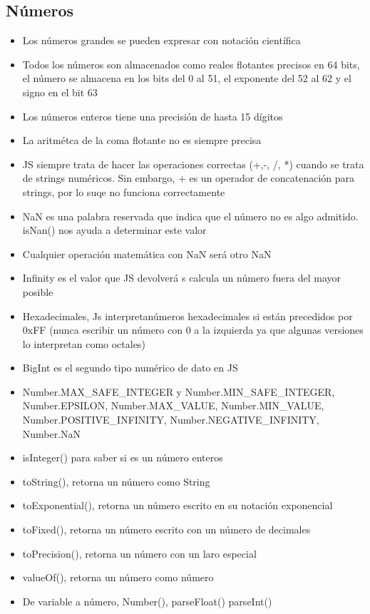 \documentclass{article}
\begin{document}
 \subsection{Números}
 \begin{itemize}
   \item Los números grandes se pueden expresar con notación científica
   \item Todos los números son almacenados como reales flotantes precisos en 64 bits, el número se almacena en los bits del 0 al 51, el exponente del 52 al 62 y el signo en el bit 63
   \item Los números enteros tiene una precisión de hasta 15 dígitos
   \item La aritmétca de la coma flotante no es siempre precisa
   \item JS siempre trata de hacer las operaciones correctas (+,-, /, *) cuando se trata de strings numéricos. Sin embargo, + es un operador de concatenación para strings, por lo suqe no funciona correctamente
   \item NaN es una palabra reservada que indica que el número no es algo admitido. isNan() nos ayuda a determinar este valor
   \item Cualquier operación matemática con NaN será otro NaN
   \item Infinity es el valor que JS devolverá s calcula un número fuera del mayor posible
   \item Hexadecimales, Js interpretanúmeros hexadecimales si están precedidos por 0xFF (nunca escribir un número con 0 a la izquierda ya que algunas versiones lo interpretan como octales)
   \item BigInt es el segundo tipo numérico de dato en JS
   \item Number.MAX_SAFE_INTEGER y Number.MIN_SAFE_INTEGER, Number.EPSILON, Number.MAX_VALUE, Number.MIN_VALUE, Number.POSITIVE_INFINITY, Number.NEGATIVE_INFINITY, Number.NaN 
   \item isInteger() para saber si es un número enteros
   \item toString(), retorna un número como String
   \item toExponential(), retorna un número escrito en su notación exponencial
   \item toFixed(), retorna un número escrito con un número de decimales
   \item toPrecision(), retorna un número con un laro especial
     \item valueOf(), retorna un número como número
     \item De variable a número, Number(), parseFloat() parseInt()
 \end{itemize}
\end{document}
